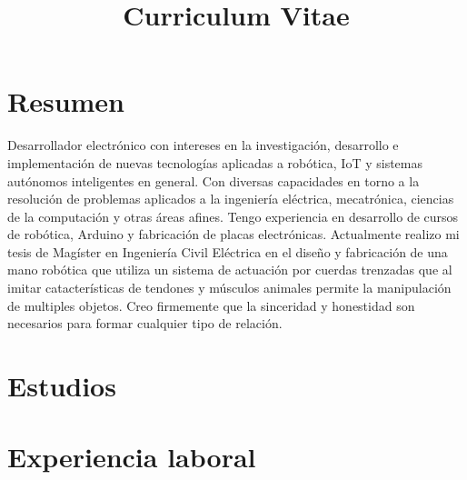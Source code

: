 \documentclass[11pt,a4paper,roman]{moderncv} %
\title{Curriculum Vitae}
\begin{document}
\makecvtitle %
\section{Resumen}
Desarrollador electr\'onico con intereses en la investigaci\'on, desarrollo e implementaci\'on de nuevas tecnolog\'ias aplicadas a rob\'otica, IoT y sistemas aut\'onomos inteligentes en general. Con diversas capacidades en torno a la resoluci\'on de problemas aplicados a la ingenier\'ia el\'ectrica, mecatr\'onica, ciencias de la computaci\'on y otras \'areas afines. Tengo experiencia en desarrollo de cursos de rob\'otica, Arduino y fabricaci\'on de placas electr\'onicas.
Actualmente realizo mi tesis de Mag\'ister en Ingenier\'ia Civil El\'ectrica en el dise\~no y fabricaci\'on de una mano rob\'otica que utiliza un sistema de actuaci\'on por cuerdas trenzadas que al imitar catacter\'isticas de tendones y m\'usculos animales permite la manipulaci\'on de multiples objetos.
Creo firmemente que la sinceridad y honestidad son necesarios para formar cualquier tipo de relaci\'on.



\section{Estudios}





\section{Experiencia laboral}
\end{document}
